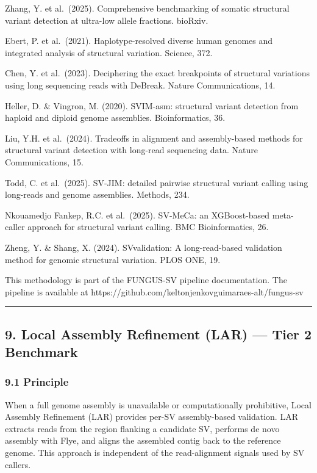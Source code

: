 \documentclass[
]{article}
\begin{document}
Zhang, Y. et al.~(2025). Comprehensive benchmarking of somatic
structural variant detection at ultra-low allele fractions. bioRxiv.

Ebert, P. et al.~(2021). Haplotype-resolved diverse human genomes and
integrated analysis of structural variation. Science, 372.

Chen, Y. et al.~(2023). Deciphering the exact breakpoints of structural
variations using long sequencing reads with DeBreak. Nature
Communications, 14.

Heller, D. \& Vingron, M. (2020). SVIM-asm: structural variant detection
from haploid and diploid genome assemblies. Bioinformatics, 36.

Liu, Y.H. et al.~(2024). Tradeoffs in alignment and assembly-based
methods for structural variant detection with long-read sequencing data.
Nature Communications, 15.

Todd, C. et al.~(2025). SV-JIM: detailed pairwise structural variant
calling using long-reads and genome assemblies. Methods, 234.

Nkouamedjo Fankep, R.C. et al.~(2025). SV-MeCa: an XGBoost-based
meta-caller approach for structural variant calling. BMC Bioinformatics,
26.

Zheng, Y. \& Shang, X. (2024). SVvalidation: A long-read-based
validation method for genomic structural variation. PLOS ONE, 19.

This methodology is part of the FUNGUS-SV pipeline documentation. The
pipeline is available at
https://github.com/keltonjenkovguimaraes-alt/fungus-sv

\begin{center}\rule{0.5\linewidth}{0.5pt}\end{center}

\hypertarget{local-assembly-refinement-lar-tier-2-benchmark}{%
\subsection{9. Local Assembly Refinement (LAR) --- Tier 2
Benchmark}\label{local-assembly-refinement-lar-tier-2-benchmark}}

\hypertarget{principle-1}{%
\subsubsection{9.1 Principle}\label{principle-1}}

When a full genome assembly is unavailable or computationally
prohibitive, Local Assembly Refinement (LAR) provides per-SV
assembly-based validation. LAR extracts reads from the region flanking a
candidate SV, performs de novo assembly with Flye, and aligns the
assembled contig back to the reference genome. This approach is
independent of the read-alignment signals used by SV callers.
\end{document}
